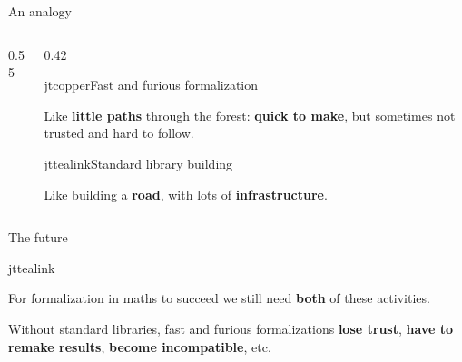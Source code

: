 \documentclass[aspectratio=169,10pt]{beamer}
\begin{document}
\begin{frame}{An analogy}
  \vfill
  \begin{columns}[c,onlytextwidth]
    \begin{column}{0.55\textwidth}
      \centering
      \resizebox{\linewidth}{!}{}
    \end{column}
    \begin{column}{0.42\textwidth}
      \begin{jtblockcap}[top=5pt,bottom=5pt]{jtcopper}{Fast and furious formalization}
        {\fontsize{10.5}{13.6}\selectfont\color{jtslate}%
          Like {\bfseries little paths} through the forest:
          {\bfseries quick to make}, but sometimes not trusted and hard
          to follow.\par}
      \end{jtblockcap}
      \vspace{2pt}
      \begin{jtblockcap}[top=5pt,bottom=5pt]{jttealink}{Standard library building}
        {\fontsize{10.5}{13.6}\selectfont\color{jtslate}%
          Like building a {\bfseries road}, with lots of
          {\bfseries infrastructure}.\par}
      \end{jtblockcap}
    \end{column}
  \end{columns}
  \vfill
\end{frame}

\begin{frame}{The future}
  \vfill
  \begin{jtquote}[top=8pt,bottom=8pt]{jttealink}
    {\fontsize{15}{20}\selectfont\color{jtslate}%
      For formalization in maths to succeed we still need
      {\bfseries both} of these activities.\par}
    \vspace{6pt}
    {\fontsize{12.5}{17}\selectfont\color{jtgrey}%
      Without standard libraries, fast and furious formalizations
      {\bfseries\color{jtslate}lose trust}, {\bfseries\color{jtslate}have
      to remake results}, {\bfseries\color{jtslate}become incompatible},
      etc.\par}
  \end{jtquote}
  \vfill
\end{frame}
\end{document}
